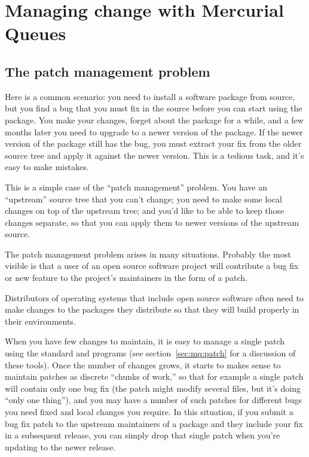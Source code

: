 \chapter{Managing change with Mercurial Queues}
\label{chap:mq}

\section{The patch management problem}
\label{sec:mq:patch-mgmt}

Here is a common scenario: you need to install a software package from
source, but you find a bug that you must fix in the source before you
can start using the package.  You make your changes, forget about the
package for a while, and a few months later you need to upgrade to a
newer version of the package.  If the newer version of the package
still has the bug, you must extract your fix from the older source
tree and apply it against the newer version.  This is a tedious task,
and it's easy to make mistakes.

This is a simple case of the ``patch management'' problem.  You have
an ``upstream'' source tree that you can't change; you need to make
some local changes on top of the upstream tree; and you'd like to be
able to keep those changes separate, so that you can apply them to
newer versions of the upstream source.

The patch management problem arises in many situations.  Probably the
most visible is that a user of an open source software project will
contribute a bug fix or new feature to the project's maintainers in the
form of a patch.

Distributors of operating systems that include open source software
often need to make changes to the packages they distribute so that
they will build properly in their environments.

When you have few changes to maintain, it is easy to manage a single
patch using the standard  and  programs
(see section~\ref{sec:mq:patch} for a discussion of these tools).
Once the number of changes grows, it starts to makes sense to maintain
patches as discrete ``chunks of work,'' so that for example a single
patch will contain only one bug fix (the patch might modify several
files, but it's doing ``only one thing''), and you may have a number
of such patches for different bugs you need fixed and local changes
you require.  In this situation, if you submit a bug fix patch to the
upstream maintainers of a package and they include your fix in a
subsequent release, you can simply drop that single patch when you're
updating to the newer release.

